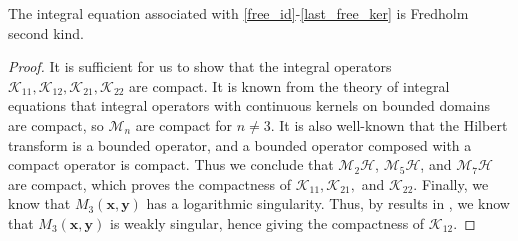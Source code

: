 \documentclass[preprint,12pt,3p]{elsarticle}
\begin{document}
\begin{cor} \label{freecorollary}
    The integral equation associated with \eqref{free_id}-\eqref{last_free_ker} is Fredholm second kind. 
\end{cor}
\begin{proof}
    It is sufficient for us to show that the integral operators $\mathcal{K}_{11}, \mathcal{K}_{12}, \mathcal{K}_{21}, \mathcal{K}_{22}$ are compact. It is known from the theory of integral equations \cite{kress} that integral operators with continuous kernels on bounded domains are compact, so $\mathcal{M}_n$ are compact for $n \neq 3$. It is also well-known that the Hilbert transform is a bounded operator, and a bounded operator composed with a compact operator is compact. Thus we conclude that $\mathcal{M}_2\mathcal{H}$,  $\mathcal{M}_5\mathcal{H}$,  and $\mathcal{M}_7\mathcal{H}$ are compact, which proves the compactness of $\mathcal{K}_{11}, \mathcal{K}_{21},  $ and $\mathcal{K}_{22}$. Finally, we know that $M_{3}(\mathbf{x},\mathbf{y})$ has a logarithmic singularity. Thus, by results in \cite{kress}, we know that $M_{3}(\mathbf{x},\mathbf{y})$ is weakly singular, hence giving the compactness of $\mathcal{K}_{12}$.
\end{proof}
\end{document}
